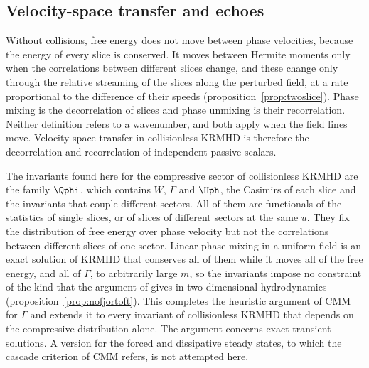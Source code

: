 \subsection{Velocity-space transfer and echoes}\label{dis:transfer}

Without collisions, free energy does not move between phase velocities, because the energy of every slice is conserved. It moves between Hermite moments only when the correlations between different slices change, and these change only through the relative streaming of the slices along the perturbed field, at a rate proportional to the difference of their speeds (proposition~\ref{prop:twoslice}). Phase mixing is the decorrelation of slices and phase unmixing is their recorrelation. Neither definition refers to a wavenumber, and both apply when the field lines move. Velocity-space transfer in collisionless KRMHD is therefore the decorrelation and recorrelation of independent passive scalars.

The invariants found here for the compressive sector of collisionless KRMHD are the family $\Qphi$, which contains $W$, $\Gamma$ and $\Hph$, the Casimirs of each slice and the invariants that couple different sectors. All of them are functionals of the statistics of single slices, or of slices of different sectors at the same $u$. They fix the distribution of free energy over phase velocity but not the correlations between different slices of one sector. Linear phase mixing in a uniform field is an exact solution of KRMHD that conserves all of them while it moves all of the free energy, and all of $\Gamma$, to arbitrarily large $m$, so the invariants impose no constraint of the kind that the argument of \citet{Fjortoft1953} gives in two-dimensional hydrodynamics (proposition~\ref{prop:nofjortoft}). This completes the heuristic argument of CMM for $\Gamma$ and extends it to every invariant of collisionless KRMHD that depends on the compressive distribution alone. The argument concerns exact transient solutions. A version for the forced and dissipative steady states, to which the cascade criterion of CMM refers, is not attempted here.

